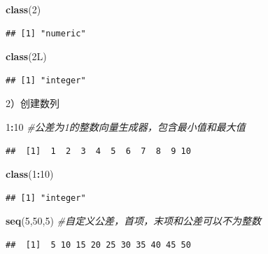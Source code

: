 \documentclass[]{book}
\newenvironment{Shaded}{\begin{snugshade}}{\end{snugshade}}
\newcommand{\CommentTok}[1]{\textcolor[rgb]{0.56,0.35,0.01}{\textit{#1}}}
\newcommand{\DecValTok}[1]{\textcolor[rgb]{0.00,0.00,0.81}{#1}}
\newcommand{\KeywordTok}[1]{\textcolor[rgb]{0.13,0.29,0.53}{\textbf{#1}}}
\newcommand{\NormalTok}[1]{#1}
\newcommand{\OperatorTok}[1]{\textcolor[rgb]{0.81,0.36,0.00}{\textbf{#1}}}
\begin{document}
\begin{Shaded}
\begin{Highlighting}[]
\KeywordTok{class}\NormalTok{(}\DecValTok{2}\NormalTok{)}
\end{Highlighting}
\end{Shaded}

\begin{verbatim}
## [1] "numeric"
\end{verbatim}

\begin{Shaded}
\begin{Highlighting}[]
\KeywordTok{class}\NormalTok{(2L)}
\end{Highlighting}
\end{Shaded}

\begin{verbatim}
## [1] "integer"
\end{verbatim}

2）创建数列

\begin{Shaded}
\begin{Highlighting}[]
\DecValTok{1}\OperatorTok{:}\DecValTok{10} \CommentTok{#公差为1的整数向量生成器，包含最小值和最大值}
\end{Highlighting}
\end{Shaded}

\begin{verbatim}
##  [1]  1  2  3  4  5  6  7  8  9 10
\end{verbatim}

\begin{Shaded}
\begin{Highlighting}[]
\KeywordTok{class}\NormalTok{(}\DecValTok{1}\OperatorTok{:}\DecValTok{10}\NormalTok{)}
\end{Highlighting}
\end{Shaded}

\begin{verbatim}
## [1] "integer"
\end{verbatim}

\begin{Shaded}
\begin{Highlighting}[]
\KeywordTok{seq}\NormalTok{(}\DecValTok{5}\NormalTok{,}\DecValTok{50}\NormalTok{,}\DecValTok{5}\NormalTok{) }\CommentTok{#自定义公差，首项，末项和公差可以不为整数}
\end{Highlighting}
\end{Shaded}

\begin{verbatim}
##  [1]  5 10 15 20 25 30 35 40 45 50
\end{verbatim}
\end{document}
